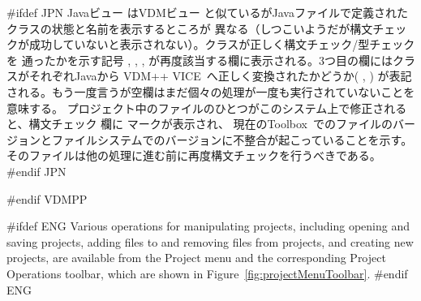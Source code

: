 \documentclass[\pformat,12pt]{article}
\newcommand{\vdmslpp}{VDM-SL}
\newcommand{\Toolbox}{Toolbox}
\newcommand{\vdmslpp}{VDM++}
\newcommand{\Toolbox}{Toolbox}
\renewcommand{\vdmslpp}{VDM++ VICE}
\newcommand{\guicmd}[1]{{\sf #1}}
\newcommand{\guicmd}[1]{{\gt #1}}
\begin{document}
#ifdef JPN
\guicmd{Javaビュー} は\guicmd{VDMビュー} と似ているがJavaファイルで定義されたクラスの状態と名前を表示するところが
異なる（しつこいようだが構文チェックが成功していないと表示されない）。クラスが正しく構文チェック/型チェックを
通ったかを示す記号
,
,
,
が再度該当する欄に表示される。3つ目の欄にはクラスがそれぞれJavaから \vdmslpp\ へ正しく変換されたかどうか(
,
)
が表記される。もう一度言うが空欄はまだ個々の処理が一度も実行されていないことを意味する。
プロジェクト中のファイルのひとつがこのシステム上で修正されると、\guicmd{構文チェック} 欄に 
マークが表示され、
現在の\Toolbox\ でのファイルのバージョンとファイルシステムでのバージョンに不整合が起こっていることを示す。
そのファイルは他の処理に進む前に再度構文チェックを行うべきである。
#endif JPN

#endif VDMPP

#ifdef ENG
Various operations for manipulating projects, including opening and
saving projects, adding files to and removing files from projects, and
creating new projects, are available from the \guicmd{Project}
menu and the corresponding \guicmd{Project
  Operations} toolbar, which are
shown in Figure~\ref{fig:projectMenuToolbar}.
#endif ENG
\end{document}
